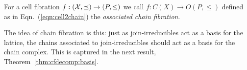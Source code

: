 % 
%
%
%
 
 For a cell fibration $f:({\mathcal X},\preceq)\to (P,\leq)$ we call $f:C(X)\to O(P,\leq)$ defined as in Eqn.~(\ref{eqn:cell2chain}) the {\em associated chain fibration}.


The idea of chain fibration is this: just as join-irreducibles act as a basis for the lattice, the chains associated to join-irreducibles should act as a basis for the chain complex.   This is captured in the next result, Theorem~\ref{thm:cfdecomp:basis}.


